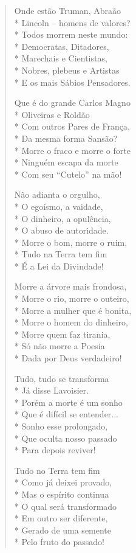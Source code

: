\begin{verse}
Onde estão Truman, Abraão\\*
Lincoln --  homens de valores?\\*
Todos morrem neste mundo:\\*
Democratas, Ditadores,\\*
Marechais e Cientistas,\\*
Nobres, plebeus e Artistas\\*
E os mais Sábios Pensadores.

Que é do grande Carlos Magno\\*
Oliveiras e Roldão\\*
Com outros Pares de França,\\*
Da mesma forma Sansão?\\*
Morre o fraco e morre o forte\\*
Ninguém escapa da morte\\*
Com seu ``Cutelo'' na mão!

Não adianta o orgulho,\\*
O egoísmo, a vaidade,\\*
O dinheiro, a opulência,\\*
O abuso de autoridade.\\*
Morre o bom, morre o ruim,\\*
Tudo na Terra tem fim\\*
É a Lei da Divindade!

Morre a árvore mais frondosa,\\*
Morre o rio, morre o outeiro,\\*
Morre a mulher que é bonita,\\*
Morre o homem do dinheiro,\\*
Morre quem faz tirania,\\*
Só não morre a Poesia\\*
Dada por Deus verdadeiro!

Tudo, tudo se transforma\\*
Já disse Lavoisier.\\*
Porém a morte é um sonho\\*
Que é difícil se entender...\\*
Sonho esse prolongado,\\*
Que oculta nosso passado\\*
Para depois reviver!

Tudo no Terra tem fim\\*
Como já deixei provado,\\*
Mas o espírito continua\\*
O qual será transformado\\*
Em outro ser diferente,\\*
Gerado de uma semente\\*
Pelo fruto do passado!


\end{verse}
